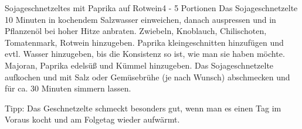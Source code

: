 \documentclass[a4paper,10pt]{article}
\begin{document}
    \begin{recipe}{Sojageschnetzeltes mit Paprika auf Rotwein}{4 
           - 5 Portionen}{}         
	Das Sojageschnetzelte 10 Minuten in kochendem Salzwasser einweichen, danach 
	auspressen und in Pflanzenöl bei hoher Hitze anbraten.
	Zwiebeln, Knoblauch, Chilischoten, Tomatenmark, Rotwein hinzugeben. Paprika 
	kleingeschnitten hinzufügen und evtl. Wasser hinzugeben, bis die Konsistenz so 
	ist, wie man sie haben möchte. Majoran, Paprika edelsüß und Kümmel hinzugeben. 
	Das Sojageschnetzelte aufkochen und mit Salz oder Gemüsebrühe (je nach Wunsch) 
	abschmecken und für ca. 30 Minuten simmern lassen.

	\freeform Tipp: Das Geschnetzelte schmeckt besonders gut, wenn man es einen 
	Tag im Voraus kocht und am Folgetag wieder aufwärmt.
    \end{recipe}
    
    \newpage
    
\end{document}
